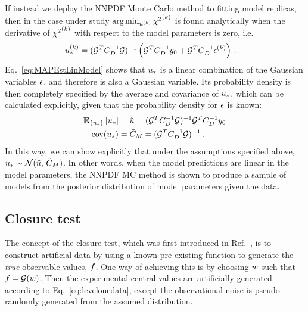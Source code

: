 If instead we deploy the NNPDF Monte Carlo method to fitting model replicas,
then in the case under study $\arg\min_{u^{(k)}} {\chi^2}^{(k)}$ is found
analytically when the derivative of ${\chi^2}^{(k)}$ with respect to the model
parameters is zero, i.e.
\begin{equation}
    \begin{split}
        \label{eq:MAPEstLinModel}
        u_*^{(k)} &= (\mathcal{G}^T C_{D}^{-1} \mathcal{G})^{-1}
        \left(
            \mathcal{G}^T C_{D}^{-1} y_0 +
            \mathcal{G}^T C_{D}^{-1} \epsilon^{(k)}
        \right) \, .
    \end{split}
\end{equation}
Eq.~\ref{eq:MAPEstLinModel} shows that $u_*$ is a linear
combination of the Gaussian variables $\epsilon$, and therefore is
also a Gaussian variable. Its
probability density is then completely specified by the average and
covariance of $u_*$, which can be calculated explicitly, given that the
probability density for $\epsilon$ is known:
\begin{align}
    \mathbf{E}_{\{ u_* \}} \left[ u_* \right] &=
    \tilde{u} = (\mathcal{G}^T C_{D}^{-1} \mathcal{G})^{-1} \mathcal{G}^T
    C_{D}^{-1} y_0 \\
    {\rm cov}(u_*) &= \tilde{C}_M = (\mathcal{G}^T C_{D}^{-1} \mathcal{G})^{-1} \, .
\end{align}
In this way, we can show explicitly that under the assumptions specified above,
$u_* \sim \mathcal{N}(\tilde{u}, \, \tilde{C}_M)$.
In other words, when the model predictions are linear in the model parameters,
the NNPDF MC method is shown to produce a sample of models from the posterior
distribution of model parameters given the data.

\subsection{Closure test}
\label{sec:closure-test-intro}

The concept of the closure test, which was first introduced in
Ref.~\cite{nnpdf30}, is to construct artificial data by using a known
pre-existing function to generate the {\em true} observable values, $f$. One
way of achieving this is by choosing $w$ such that $f =
\mathcal{G}(w)$. Then the experimental central values are artificially
generated according to Eq.~\ref{eq:levelonedata}, except the observational noise
is pseudo-randomly generated from the assumed distribution.

